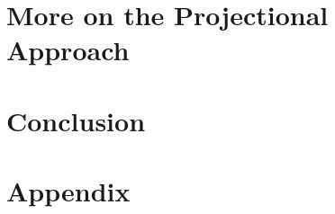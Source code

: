 \documentclass[11pt,a4paper,bibtotoc,idxtotoc,headsepline,footsepline,footexclude,BCOR12mm,DIV13,hidelinks]{scrbook}
\begin{document}
		\part[More on the Projectional Approach]{More on the Projectional Approach}
		\label{part:moreprojection}
		
		
		
		
		\part[Conclusion]{Conclusion}
		\label{part:conclusion}
		
		
		
		
		
		\part*{Appendix}
		
		\appendix %
		
		
		
	


  \clearemptydoublepage
  
	
	
 
\end{document}
